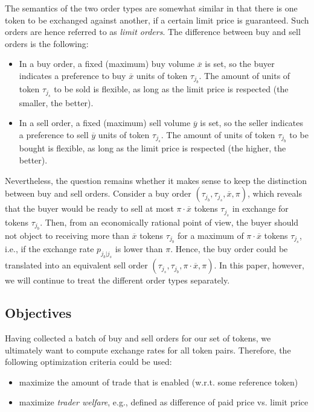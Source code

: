 \documentclass[11pt,parskip=full]{scrartcl}%
\newcommand*{\ie}{i.e., }
\newcommand*{\eg}{e.g., }
\newcommand*{\wrt}{w.r.t. }
\begin{document}
The semantics of the two order types are somewhat similar in that there is one token to be
exchanged against another, if a certain limit price is guaranteed.
Such orders are hence referred to as \emph{limit orders}.
The difference between buy and sell orders is the following:
\begin{itemize}
  \item In a buy order, a fixed (maximum) buy volume $ \overline{x} $ is set, so the buyer
  indicates a preference to buy $ \overline{x} $ units of token $ \tau_{j_b} $.
  The amount of units of token $ \tau_{j_s} $ to be sold is flexible, as long as the limit price is
  respected (the smaller, the better).
  \item In a sell order, a fixed (maximum) sell volume $ \overline{y} $ is set, so the seller
  indicates a preference to sell $ \overline{y} $ units of token $ \tau_{j_s} $.
  The amount of units of token $ \tau_{j_b} $ to be bought is flexible, as long as the limit price
  is respected (the higher, the better).
\end{itemize}
\vspace{.3cm}

Nevertheless, the question remains whether it makes sense to keep the distinction between buy and
sell orders.
Consider a buy order $ (\tau_{j_b},\tau_{j_s},\overline{x},\pi) $, which reveals that the buyer
would be ready to sell at most $ \pi \cdot \overline{x} $ tokens $ \tau_{j_s} $ in exchange for
tokens $ \tau_{j_b} $.
Then, from an economically rational point of view, the buyer should not object to receiving more
than $ \overline{x} $ tokens $ \tau_{j_b} $ for a maximum of $ \pi \cdot \overline{x} $ tokens
$ \tau_{j_s} $, \ie if the exchange rate $ p_{j_b|j_s} $ is lower than $ \pi $.
Hence, the buy order could be translated into an equivalent sell order
$ (\tau_{j_s},\tau_{j_b},\pi \cdot \overline{x},\pi) $.
In this paper, however, we will continue to treat the different order types separately.



\subsection{Objectives}
\label{subsec:objectives}

Having collected a batch of buy and sell orders for our set of tokens, we ultimately want to
compute exchange rates for all token pairs.
Therefore, the following optimization criteria could be used:
\begin{itemize}
  \item maximize the amount of trade that is enabled (\wrt some reference token)
  \item maximize \emph{trader welfare}, \eg defined as difference of paid price vs. limit price
\end{itemize}
\end{document}
